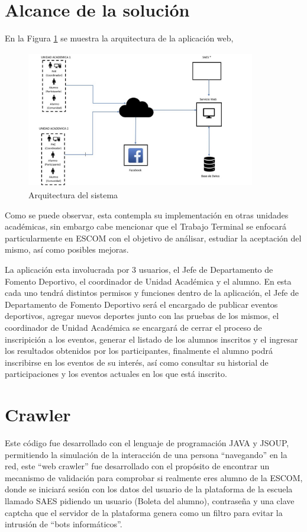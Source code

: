 	\section{Alcance de la solución}
	\noindent En la Figura \ref{arquitectura} se muestra la arquitectura de la aplicación web,
	\begin{figure}[hbt!]
		\centering
		\includegraphics[width=10cm, height=6cm]{Imagenes/arquitectura}
		\caption{Arquitectura del sistema}
		\label{arquitectura}
	\end{figure}

	\noindent Como se puede observar, esta contempla su implementación en otras unidades académicas, sin embargo cabe mencionar que el Trabajo Terminal se enfocará particularmente en ESCOM con el objetivo de análisar, estudiar la aceptación del mismo, así como posibles mejoras.
	
	\noindet La aplicación esta involucrada por 3 usuarios, el Jefe de Departamento de Fomento Deportivo, el coordinador de Unidad Académica y el alumno. En esta cada uno tendrá distintos permisos y funciones dentro de la aplicación, el Jefe de Departamento de Fomento Deportivo será el encargado de publicar eventos deportivos, agregar nuevos deportes junto con las pruebas de los mismos, el coordinador de Unidad Académica se encargará de cerrar el proceso de inscripición a los eventos, generar el listado de los alumnos inscritos y el ingresar los resultados obtenidos por los participantes, finalmente el alumno podrá inscribirse en los eventos de su interés, así como consultar su historial de participaciones y los eventos actuales en los que está inscrito.
	
	
	\section{Crawler}
	\label{crawler}
	\noindent Este código fue desarrollado con el lenguaje de programación JAVA y JSOUP, permitiendo la simulación de la interacción de una persona “navegando” en la red, este “web crawler” fue desarrollado con el propósito de encontrar un mecanismo de validación para comprobar si realmente eres alumno de la ESCOM, donde se iniciará sesión con los datos del usuario de la plataforma de la escuela llamado SAES pidiendo un usuario (Boleta del alumno), contraseña y una clave captcha que el servidor de la plataforma genera como un filtro para evitar la intrusión de “bots informáticos”.\\
	
